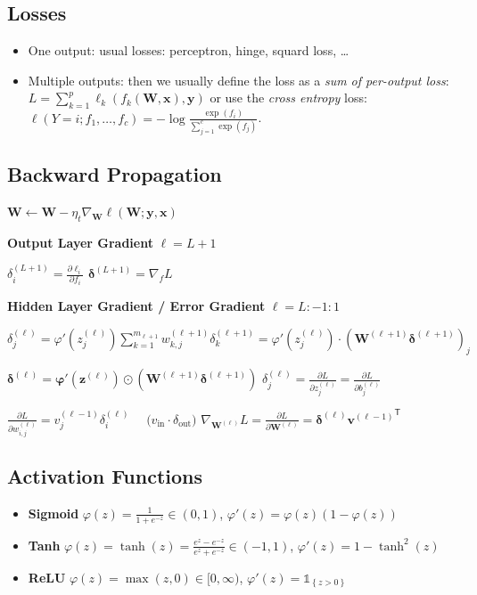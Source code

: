 \documentclass[a4paper,8pt,landscape]{extarticle}
\newcommand{\set}[1]{\left\{ #1 \right\}}
\newcommand{\ind}[1]{\mathds{1}_{\set{#1}}}
\newcommand*{\T}{\mathsf{T}}
\newcommand{\mat}[1]{\mathbf{#1}}
\renewcommand{\vec}[1]{\mathbf{#1}}
\newcommand{\vv}{\vec{v}}
\newcommand{\vx}{\vec{x}}
\newcommand{\vy}{\vec{y}}
\newcommand{\vz}{\vec{z}}
\newcommand{\vvarphi}{\boldsymbol{\varphi}}
\newcommand{\vdelta}{\boldsymbol{\delta}}
\newcommand{\MW}{\mat{W}}
\begin{document}
\begin{multicols*}{3}
\subsection{Losses}

\begin{itemize}
  \item One output: usual losses: perceptron, hinge, squard loss, \ldots
  \item Multiple outputs: then we usually define the loss as a \emph{sum of
per-output loss}:
$
L = \sum_{k=1}^p \ell_k(f_k(\MW,\vx),\vy)
$
or use the \emph{cross entropy} loss:   
$\ell(Y=i;f_1,\ldots,f_c)=-\log\frac{\exp(f_i)}{\sum_{j=1}^c \exp(f_j)}$.
\end{itemize}

\subsection{Backward Propagation}

$\MW\leftarrow\MW-\eta_t\nabla_{\MW}\ell(\MW;\vy,\vx)$

\textbf{Output Layer Gradient} $\ell=L+1$

$
\displaystyle
\delta_i^{(L+1)}=\frac{\partial \ell_i}{\partial f_i}
$
\quad
$
\displaystyle
\vdelta^{(L+1)}=\nabla_f L
$

\textbf{Hidden Layer Gradient / Error Gradient} $\ell=L:-1:1$

$
\delta_j^{(\ell)}
=
\varphi'(z_j^{(\ell)})
\sum_{k=1}^{m_{\ell+1}}w_{k,j}^{(\ell+1)}\delta_k^{(\ell+1)}
=
\varphi'(z_j^{(\ell)})
\cdot \left(\MW^{(\ell+1)}\vdelta^{(\ell+1)}\right)_j
$

$
\vdelta^{(\ell)}
=
\vvarphi'(\vz^{(\ell)}) \odot \left(\MW^{(\ell+1)}\vdelta^{(\ell+1)}\right)
$
\quad
$
\delta^{(\ell)}_j
=\frac{\partial L}{\partial z^{(\ell)}_j}
= \frac{\partial L}{\partial b^{(\ell)}_j}
$

$
\frac{\partial L}{\partial w_{i,j}^{(\ell)}}
=
v_j^{(\ell-1)}\delta_i^{(\ell)}
\quad\,\,
\big(v_{\text{in}}\cdot \delta_{\text{out}}
\big)
$
\quad
$
\nabla_{\MW^{(\ell)}}L=
\frac{\partial L}{\partial \MW^{(\ell)}}
=
\vdelta^{(\ell)}{\vv^{(\ell-1)}}^\T
$



\subsection{Activation Functions}

\begin{itemize}
  \item \textbf{Sigmoid}
  $\varphi(z)=\frac{1}{1+e^{-z}}\in(0,1)$,
  \quad$\varphi'(z)=\varphi(z)(1-\varphi(z))$
  \item \textbf{Tanh}
  $\varphi(z)=\tanh(z)=\frac{e^z-e^{-z}}{e^z+e^{-z}}\in(-1,1)$,\quad
  $\varphi'(z)=1-\tanh^2(z)$
  \item \textbf{ReLU}
  $\varphi(z)=\max(z,0)\in[0,\infty)$,\quad
  $\varphi'(z)=\ind{z>0}$
\end{itemize}


\end{multicols*}
\end{document}
